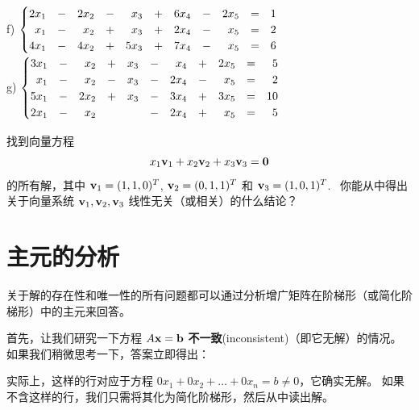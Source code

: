\begin{problemset}
\\
f) $\begin{cases} \begin{array}{@{}rcrcrcrcrcr@{}} 2x_1 & - & 2x_2 & - & x_3 & + & 6x_4 & - & 2x_5 & = & 1 \\ x_1 & - & x_2 & + & x_3 & + & 2x_4 & - & x_5 & = & 2 \\ 4x_1 & - & 4x_2 & + & 5x_3 & + & 7x_4 & - & x_5 & = & 6 \end{array} \end{cases}$
\\
g) $\begin{cases} \begin{array}{@{}rcrcrcrcrcr@{}} 3x_1 & - & x_2 & + & x_3 & - & x_4 & + & 2x_5 & = & 5 \\ x_1 & - & x_2 & - & x_3 & - & 2x_4 & - & x_5 & = & 2 \\ 5x_1 & - & 2x_2 & + & x_3 & - & 3x_4 & + & 3x_5 & = & 10 \\ 2x_1 & - & x_2 & & & - & 2x_4 & + & x_5 & = & 5 \end{array} \end{cases}$
\item \label{ex:02-02-02} 找到向量方程 $$x_1 \mathbf{v}_1 + x_2 \mathbf{v}_2 + x_3 \mathbf{v}_3 = \mathbf{0}$$
的所有解，其中 $\mathbf{v}_1 = (1, 1, 0)^T$, $\mathbf{v}_2 = (0, 1, 1)^T$ 和 $\mathbf{v}_3 = (1, 0, 1)^T$. ~你能从中得出关于向量系统 $\mathbf{v}_1, \mathbf{v}_2, \mathbf{v}_3$ 线性无关（或相关）的什么结论？
\end{problemset}


\section{主元的分析}\label{sec:02-03}

关于解的存在性和唯一性的所有问题都可以通过分析增广矩阵在阶梯形（或简化阶梯形）中的主元来回答。

首先，让我们研究一下方程 $A \mathbf{x} = \mathbf{b}$ \textbf{不一致}(inconsistent)（即它无解）的情况。如果我们稍微思考一下，答案立即得出：


实际上，这样的行对应于方程 $0 x_1 + 0 x_2 + \dots + 0 x_n = b \neq 0$，它确实无解。
如果不含这样的行，我们只需将其化为简化阶梯形，然后从中读出解。

